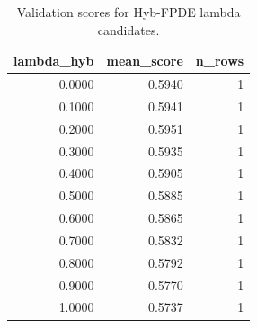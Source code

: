 \begin{table}[t]
\caption{Validation scores for Hyb-FPDE lambda candidates.}
\label{tab:lambda_distribution_computed}
\centering
\begin{tabular}{rrr}
\toprule
lambda\_hyb & mean\_score & n\_rows \\
\midrule
0.0000 & 0.5940 & 1 \\
0.1000 & 0.5941 & 1 \\
0.2000 & 0.5951 & 1 \\
0.3000 & 0.5935 & 1 \\
0.4000 & 0.5905 & 1 \\
0.5000 & 0.5885 & 1 \\
0.6000 & 0.5865 & 1 \\
0.7000 & 0.5832 & 1 \\
0.8000 & 0.5792 & 1 \\
0.9000 & 0.5770 & 1 \\
1.0000 & 0.5737 & 1 \\
\bottomrule
\end{tabular}

\end{table}
